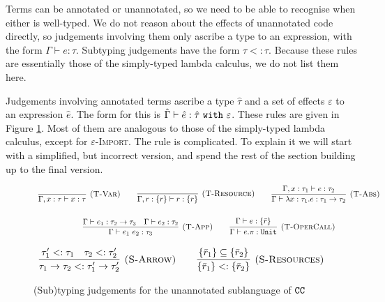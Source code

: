 Terms can be annotated or unannotated, so we need to be able to
recognise when either is well-typed. We do not reason about the
effects of unannotated code directly, so judgements involving them
only ascribe a type to an expression, with the form $\Gamma \vdash e: \tau$.
Subtyping judgements have the form $\tau <: \tau$. Because these rules are
essentially those of the simply-typed lambda calculus, we do not list
them here.

Judgements involving annotated terms ascribe a type $\hat \tau$ and a set of effects
$\varepsilon$ to an expression $\hat e$. The form for this is
$\hat \Gamma \vdash \hat e: \hat \tau~\mathtt{with}~ \varepsilon$. These rules are given
in Figure \ref{fig:unannotated_static_rules}. Most of them are analogous to those of
the simply-typed lambda calculus, except for \textsc{$\varepsilon$-Import}. The rule
is complicated. To explain it we will start with a simplified, but incorrect version, and
spend the rest of the section building up to the final version.

\begin{figure}
\vspace{-5pt}


\[
\begin{array}{c}


\infer[\textsc{(T-Var)}]
	{\Gamma, x: \tau \vdash x: \tau}
	{}
\hspace{5ex}
\infer[\textsc{(T-Resource)}]
	{\Gamma, r: \{ r \} \vdash r : \{ r \}}
	{}

\hspace{5ex}
\infer[\textsc{(T-Abs)}]
	{\Gamma \vdash \lambda x: \tau_1.e : \tau_1 \rightarrow \tau_2}
	{\Gamma, x: \tau_1 \vdash e: \tau_2}\\[4ex]
	
\infer[\textsc{(T-App)}]
	{\Gamma \vdash e_1~e_2: \tau_3}
	{\Gamma \vdash e_1: \tau_2 \rightarrow \tau_3 & \Gamma \vdash e_2: \tau_2}
\hspace{5ex}
\infer[\textsc{(T-OperCall)}]
	{\Gamma \vdash e.\pi: \kwa{Unit}}
	{\Gamma \vdash e: \{ \bar r \}}

\end{array}
\]

\fbox{$\tau <: \tau$}

\[
\begin{array}{c}

\infer[\textsc{(S-Arrow)}]
	{ \tau_1 \rightarrow \tau_2 <: \tau_1' \rightarrow \tau_2' }
	{ \tau_1' <: \tau_1 & \tau_2 <: \tau_2' }
\hspace{5ex}
\infer[\textsc{(S-Resources)}]
	{ \{ \bar r_1 \} <: \{ \bar r_2 \} }
	{ \{ \bar r_1 \} \subseteq \{ \bar r_2 \} }

\end{array}
\]

\vspace{-0.3cm}
\caption{(Sub)typing judgements for the unannotated sublanguage of $\mathtt{CC}$}
\vspace{-0.3cm}
\label{fig:unannotated_static_rules}
\end{figure}

